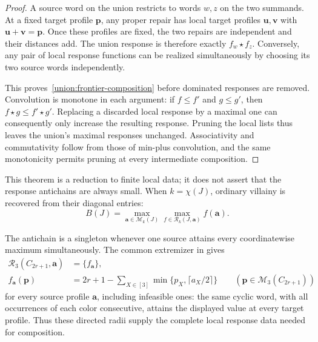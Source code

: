 \documentclass[11pt,reqno]{amsart}
\numberwithin{equation}{section}
\theoremstyle{definition}
\theoremstyle{remark}
\begin{document}
\begin{proof}
A source word on the union restricts to words $w,z$ on the two
summands. At a fixed target profile $\mathbf p$, any proper repair
has local target profiles $\mathbf u,\mathbf v$ with
$\mathbf u+\mathbf v=\mathbf p$. Once these profiles are fixed,
the two repairs are independent and their distances add. The union
response is therefore exactly $f_w\star f_z$. Conversely, any pair
of local response functions can be realized simultaneously by choosing
its two source words independently.

This proves~\eqref{union:frontier-composition} before dominated
responses are removed. Convolution is monotone in each argument:
if $f\le f'$ and $g\le g'$, then $f\star g\le f'\star g'$.
Replacing a discarded local response by a maximal one can consequently
only increase the resulting response. Pruning the local lists thus
leaves the union's maximal responses unchanged. Associativity and
commutativity follow from those of min-plus convolution, and the same
monotonicity permits pruning at every intermediate composition.
\end{proof}

This theorem is a reduction to finite local data; it does not assert
that the response antichains are always small. When $k=\chi(J)$,
ordinary villainy is recovered from their diagonal entries:
\begin{equation}\label{union:response-diagonal}
 B(J)=\max_{\mathbf a\in\mathcal M_k(J)}
       \max_{f\in\mathcal R_k(J,\mathbf a)}f(\mathbf a).
\end{equation}

The antichain is a singleton whenever one source attains every
coordinatewise maximum simultaneously. The common extremizer in
\cite[Theorem~3.15]{jiang2026exact} gives
\[
\begin{aligned}
 \mathcal R_3(C_{2r+1},\mathbf a)&=\{f_{\mathbf a}\},\\
 f_{\mathbf a}(\mathbf p)&=2r+1-
 \sum_{X\in[3]}\min\{p_X,\lceil a_X/2\rceil\}
 \qquad(\mathbf p\in\mathcal M_3(C_{2r+1}))
\end{aligned}
\]
for every source profile $\mathbf a$, including infeasible ones:
the same cyclic word, with all occurrences of each color consecutive,
attains the displayed value at every target profile.
Thus these directed radii supply the complete local response
data needed for composition.
\end{document}
